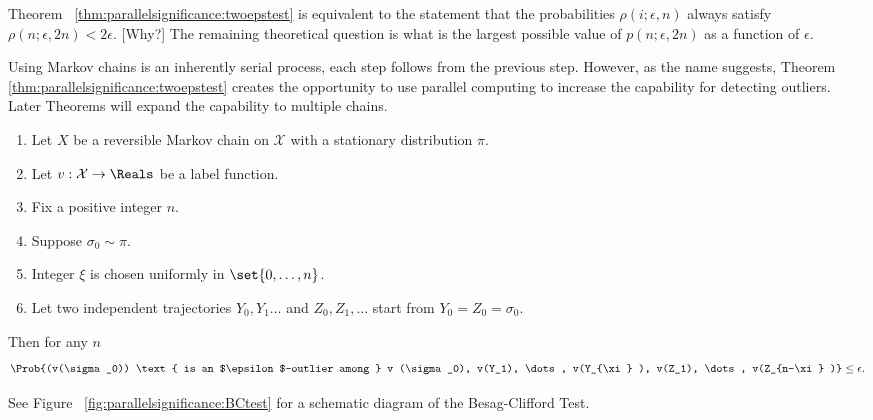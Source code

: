 \documentclass[12pt]{article}
\begin{document}
\begin{remark}
    Theorem~%
    \ref{thm:parallelsignificance:twoepstest} is equivalent to the statement that the
    probabilities \( \rho(i; \epsilon, n) \) always satisfy \( \rho(n;
    \epsilon, 2n) < 2\epsilon \). [Why?]  The remaining theoretical question is
    what is the largest possible value of \( p(n; \epsilon, 2n) \) as a
    function of \( \epsilon \).
\end{remark}

\begin{remark}
  Using Markov chains is an inherently serial process, each step
  follows from the previous step.  However,
  as the name suggests, Theorem~%
    \ref{thm:parallelsignificance:twoepstest} creates the opportunity
    to use parallel computing to increase the  capability for
    detecting outliers. Later Theorems will expand the capability to
    multiple chains.
  \end{remark}

  
\begin{theorem}
    \label{thm:parallelsignificance:bc1}
    \begin{enumerate}
        \item
            Let \( X \) be a reversible Markov chain on \( \mathcal{X} \)
            with a stationary distribution \( \pi \).
        \item
            Let \( v :  \mathcal{X} \to \Reals \) be a label function.
        \item
            Fix a positive integer \( n \).
        \item
            Suppose  \( \sigma_0 \sim \pi \).
        \item
            Integer \( \xi \) is chosen uniformly in \( \set{0,\dots, n}
            \).
        \item
            Let two independent trajectories \( Y_0 , Y_1 \dots \) and \(
            Z_0, Z_1, \dots \) start from \( Y_0 = Z_0 = \sigma_0 \).
    \end{enumerate}
    Then for any \( n \)
    \[
        \Prob{(v(\sigma_0)) \text{ is an $\epsilon$-outlier among } v
        (\sigma_0), v(Y_1), \dots, v(Y_{\xi} ), v(Z_1), \dots, v(Z_{n-\xi}
        )} \le \epsilon.
    \]
\end{theorem}

\begin{remark}
    See Figure~%
    \ref{fig:parallelsignificance:BCtest} for a schematic diagram of the
    Besag-Clifford Test.
\end{remark}
\end{document}
